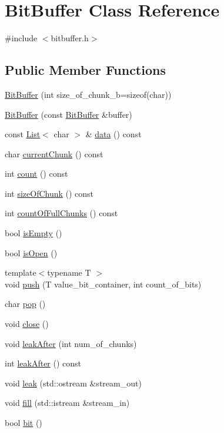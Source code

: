 \hypertarget{class_bit_buffer}{}\section{Bit\+Buffer Class Reference}
\label{class_bit_buffer}


{\ttfamily \#include $<$bitbuffer.\+h$>$}

\subsection*{Public Member Functions}
\begin{DoxyCompactItemize}
\item 
\hyperlink{class_bit_buffer_a9b9c57bd5827f631bb594476323eb861}{Bit\+Buffer} (int size\+\_\+of\+\_\+chunk\+\_\+b=sizeof(char))
\item 
\hyperlink{class_bit_buffer_af78925f3b1d992d934545616c1d00dd2}{Bit\+Buffer} (const \hyperlink{class_bit_buffer}{Bit\+Buffer} \&buffer)
\item 
const \hyperlink{class_list}{List}$<$ char $>$ \& \hyperlink{class_bit_buffer_ad56372e6eb410a195913a0cae28d7006}{data} () const
\item 
char \hyperlink{class_bit_buffer_a3f5383b7d9b27478f614cd8762a266a5}{current\+Chunk} () const
\item 
int \hyperlink{class_bit_buffer_a8c13b651d37586ec5c2d30f45ed89e53}{count} () const
\item 
int \hyperlink{class_bit_buffer_adf758958884467e15cd018190178bf3d}{size\+Of\+Chunk} () const
\item 
int \hyperlink{class_bit_buffer_ad473b6b2aedbb96198d57d5762c5c108}{count\+Of\+Full\+Chunks} () const
\item 
bool \hyperlink{class_bit_buffer_aaec114c48d1b1be84a8178b6b956f3d0}{is\+Empty} ()
\item 
bool \hyperlink{class_bit_buffer_ae70825daafd0a00625fbb6dfb9b83fba}{is\+Open} ()
\item 
{\footnotesize template$<$typename T $>$ }\\void \hyperlink{class_bit_buffer_a1998d0bdd95e025f39e81671f5a20106}{push} (T value\+\_\+bit\+\_\+container, int count\+\_\+of\+\_\+bits)
\item 
char \hyperlink{class_bit_buffer_a8f569dfa9535ac107c84846f22a45221}{pop} ()
\item 
void \hyperlink{class_bit_buffer_a1075aee0daeee83dbe4908c325b6969f}{close} ()
\item 
void \hyperlink{class_bit_buffer_a10df48560dfbdd304a4e05a610379dc8}{leak\+After} (int num\+\_\+of\+\_\+chunks)
\item 
int \hyperlink{class_bit_buffer_a28c31e06cd23a8ab3f7276bbb2c64b39}{leak\+After} () const
\item 
void \hyperlink{class_bit_buffer_a56d1e27a00a27e1ac95f2e03255081eb}{leak} (std\+::ostream \&stream\+\_\+out)
\item 
void \hyperlink{class_bit_buffer_a91b2bfeb34d3e2d01fd23f417928f261}{fill} (std\+::istream \&stream\+\_\+in)
\item 
bool \hyperlink{class_bit_buffer_a50d13861a778aff828e42e4f32371726}{bit} ()
\end{DoxyCompactItemize}


